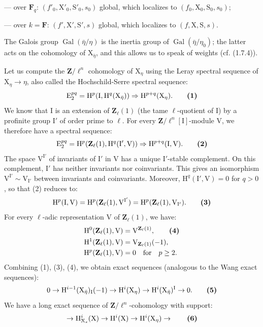\documentclass[11pt,leqno]{article}
\begin{document}
\noindent — over \(\mathbf F_q\): \((f'_0,\mathrm X'_0,\mathrm S'_0,s_0)\) global, which localizes to \((f_0,\mathrm X_0,\mathrm S_0,s_0)\);

\noindent — over \(k=\mathbf F\): \((f',\mathrm X',\mathrm S',s)\) global, which localizes to \((f,\mathrm X,\mathrm S,s)\).

The Galois group \(\operatorname{Gal}(\bar\eta/\eta)\) is the inertia group of \(\operatorname{Gal}(\bar\eta/\eta_0)\); the latter acts on the cohomology of \(\mathrm X_{\bar\eta}\), and this allows us to speak of weights (cf. (1.7.4)).

Let us compute the \(\mathbf Z/\ell^n\) cohomology of \(\mathrm X_\eta\) using the Leray spectral sequence of \(\mathrm X_\eta\to\eta\), also called the Hochschild-Serre spectral sequence:
\[
\mathrm E_2^{pq}=\mathrm H^p(\mathrm I,\mathrm H^q(\mathrm X_{\bar\eta}))
\Rightarrow\mathrm H^{p+q}(\mathrm X_\eta).
\tag*{\textbf{(1)}}
\]
We know that \(\mathrm I\) is an extension of \(\mathbf Z_\ell(1)\) (the tame \(\ell\)-quotient of \(\mathrm I\)) by a profinite group \(\mathrm I'\) of order prime to \(\ell\). For every \(\mathbf Z/\ell^n[\mathrm I]\)-module \(\mathrm V\), we therefore have a spectral sequence:
\[
\mathrm E_2^{pq}=\mathrm H^p(\mathbf Z_\ell(1),\mathrm H^q(\mathrm I',\mathrm V))
\Rightarrow\mathrm H^{p+q}(\mathrm I,\mathrm V).
\tag*{\textbf{(2)}}
\]
The space \(\mathrm V^{\mathrm I'}\) of invariants of \(\mathrm I'\) in \(\mathrm V\) has a unique \(\mathrm I'\)-stable complement. On this complement, \(\mathrm I'\) has neither invariants nor coinvariants. This gives an isomorphism \(\mathrm V^{\mathrm I'}\sim\mathrm V_{\mathrm I'}\) between invariants and coinvariants. Moreover, \(\mathrm H^q(\mathrm I',\mathrm V)=0\) for \(q>0\), so that (2) reduces to:
\[
\mathrm H^p(\mathrm I,\mathrm V)
=\mathrm H^p(\mathbf Z_\ell(1),\mathrm V^{\mathrm I'})
=\mathrm H^p(\mathbf Z_\ell(1),\mathrm V_{\mathrm I'}).
\tag*{\textbf{(3)}}
\]
For every \(\ell\)-adic representation \(\mathrm V\) of \(\mathbf Z_\ell(1)\), we have:
\begin{align*}
\mathrm H^0(\mathbf Z_\ell(1),\mathrm V)&=\mathrm V^{\mathbf Z_\ell(1)},
\tag*{\textbf{(4)}}\\
\mathrm H^1(\mathbf Z_\ell(1),\mathrm V)&=\mathrm V_{\mathbf Z_\ell(1)}(-1),\\
\mathrm H^p(\mathbf Z_\ell(1),\mathrm V)&=0\quad\text{for}\quad p\geq2.
\end{align*}
Combining (1), (3), (4), we obtain exact sequences (analogous to the Wang exact sequences):
\[
0\to\mathrm H^{i-1}(\mathrm X_{\bar\eta})_{\mathrm I}(-1)
\to\mathrm H^i(\mathrm X_\eta)
\to\mathrm H^i(\mathrm X_{\bar\eta})^{\mathrm I}\to0.
\tag*{\textbf{(5)}}
\]
We have a long exact sequence of \(\mathbf Z/\ell^n\)-cohomology with support:
\[
\to\mathrm H^i_{\mathrm X_s}(\mathrm X)
\to\mathrm H^i(\mathrm X)
\to\mathrm H^i(\mathrm X_\eta)\to
\tag*{\textbf{(6)}}
\]
\end{document}
